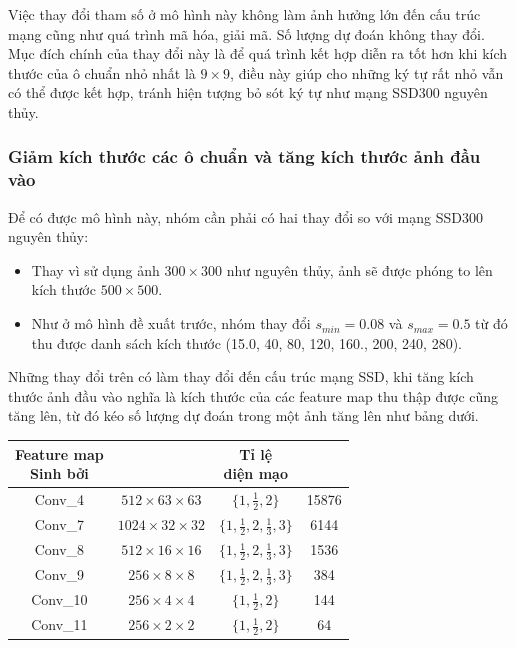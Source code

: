 \documentclass[a4paper,12pt]{article}
\begin{document}
	Việc thay đổi tham số ở mô hình này không làm ảnh hưởng lớn đến cấu trúc mạng cũng như quá trình mã hóa, giải mã. Số lượng dự đoán không thay đổi.\\
	
	Mục đích chính của thay đổi này là để quá trình kết hợp diễn ra tốt hơn khi kích thước của ô chuẩn nhỏ nhất là $9 \times 9$, điều này giúp cho những ký tự rất nhỏ vẫn có thể được kết hợp, tránh hiện tượng bỏ sót ký tự như mạng SSD300 nguyên thủy\cite{liu2016ssd}.
	
	\subsubsection*{Giảm kích thước các ô chuẩn và tăng kích thước ảnh đầu vào}
	
	Để có được mô hình này, nhóm cần phải có hai thay đổi so với mạng SSD300 nguyên thủy\cite{liu2016ssd}:
	\begin{itemize}
		\item Thay vì sử dụng ảnh $300 \times 300$ như nguyên thủy, ảnh sẽ được phóng to lên kích thước $500 \times 500$.
		\item Như ở mô hình đề xuất trước, nhóm thay đổi $s_{min} = 0.08$ và $s_{max} = 0.5$ từ đó thu được danh sách kích thước (15.0, 40, 80, 120, 160., 200, 240, 280).
	\end{itemize}
	
	Những thay đổi trên có làm thay đổi đến cấu trúc mạng SSD\cite{liu2016ssd}, khi tăng kích thước ảnh đầu vào nghĩa là kích thước của các feature map thu thập được cũng tăng lên, từ đó kéo số lượng dự đoán trong một ảnh tăng lên như bảng dưới.\\
	
	\begin{center}
		\begin{tabular}{||c | c | c | c ||} 
			\hline
			\makecell{ Feature map \\ Sinh bởi } & \makecell{ Kích thước} & \makecell{Tỉ lệ \\ diện mạo } &  \makecell{ Số dự đoán } \\ [0.5ex] 
			\hline\hline
			Conv\_4 & $512 \times 63 \times 63$ & $ \{ 1, \frac{1}{2} , 2\} $ & 15876 \\ 
			\hline
			Conv\_7 & $1024 \times 32 \times 32$ & $ \{ 1, \frac{1}{2} , 2, \frac{1}{3}, 3\} $ & 6144 \\ 
			\hline
			Conv\_8 & $512 \times 16 \times 16$ &  $ \{ 1, \frac{1}{2} , 2, \frac{1}{3}, 3\} $ & 1536 \\ 
			\hline
			Conv\_9 & $256 \times 8 \times 8 $ &  $ \{ 1, \frac{1}{2} , 2, \frac{1}{3}, 3\} $ & 384  \\ 
			\hline
			Conv\_10 & $256 \times 4 \times 4$ & $ \{ 1, \frac{1}{2} , 2\} $ & 144 \\ 
			\hline
			Conv\_11 & $256 \times 2 \times 2$ & $ \{ 1, \frac{1}{2} , 2\} $ & 64 \\ 
			\hline
		\end{tabular}
	\end{center}
	
\end{document}
